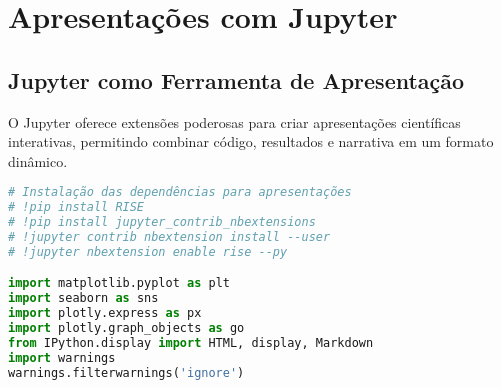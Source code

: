 \section{Apresentações com Jupyter}

\subsection{Jupyter como Ferramenta de Apresentação}

O Jupyter oferece extensões poderosas para criar apresentações científicas interativas, permitindo combinar código, resultados e narrativa em um formato dinâmico.

\begin{pythonbox}
\begin{lstlisting}[language=Python]
# Instalação das dependências para apresentações
# !pip install RISE
# !pip install jupyter_contrib_nbextensions
# !jupyter contrib nbextension install --user
# !jupyter nbextension enable rise --py

import matplotlib.pyplot as plt
import seaborn as sns
import plotly.express as px
import plotly.graph_objects as go
from IPython.display import HTML, display, Markdown
import warnings
warnings.filterwarnings('ignore')
\end{lstlisting}
\end{pythonbox}

